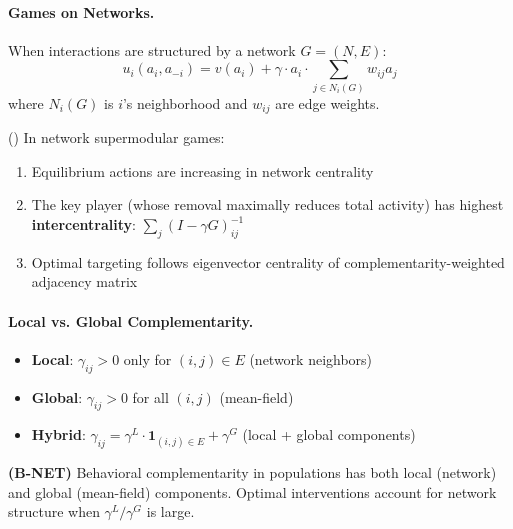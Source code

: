 \paragraph{Games on Networks.}

When interactions are structured by a network $G = (N, E)$:
\begin{equation}
u_i(a_i, a_{-i}) = v(a_i) + \gamma \cdot a_i \cdot \sum_{j \in N_i(G)} w_{ij} a_j
\end{equation}
where $N_i(G)$ is $i$'s neighborhood and $w_{ij}$ are edge weights.

\begin{theorem}
\label{thm:network-super}
\textup{(\citet{jackson2015games})}
In network supermodular games:
\begin{enumerate}
    \item Equilibrium actions are increasing in network centrality
    \item The key player (whose removal maximally reduces total activity) has 
    highest \textbf{intercentrality}: $\sum_j (I - \gamma G)^{-1}_{ij}$
    \item Optimal targeting follows eigenvector centrality of complementarity-weighted 
    adjacency matrix
\end{enumerate}
\end{theorem}

\paragraph{Local vs. Global Complementarity.}

\begin{definition}
\label{def:comp-scope}
\begin{itemize}
    \item \textbf{Local}: $\gamma_{ij} > 0$ only for $(i,j) \in E$ (network neighbors)
    \item \textbf{Global}: $\gamma_{ij} > 0$ for all $(i,j)$ (mean-field)
    \item \textbf{Hybrid}: $\gamma_{ij} = \gamma^L \cdot \mathbf{1}_{(i,j) \in E} + 
    \gamma^G$ (local + global components)
\end{itemize}
\end{definition}

\begin{axiom}
\label{ax:B-NET}
\textbf{(B-NET)} Behavioral complementarity in populations has both local (network) 
and global (mean-field) components. Optimal interventions account for network 
structure when $\gamma^L / \gamma^G$ is large.
\end{axiom}

